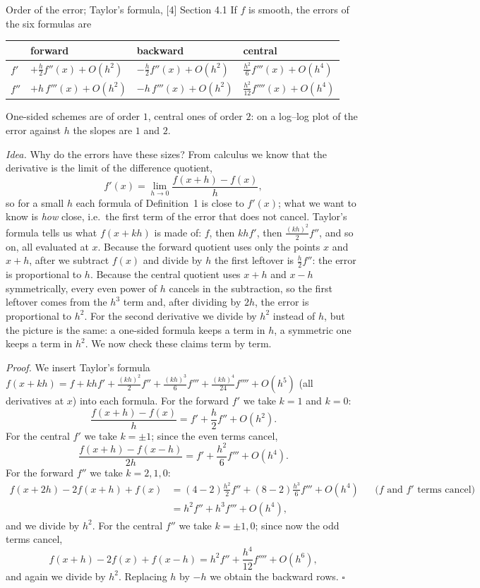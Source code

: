 \documentclass[11pt,a4paper]{article}
\begin{document}
\begin{lembox}{Order of the error; Taylor's formula, [4] Section 4.1}
If $f$ is smooth, the errors of the six formulas are
\begin{center}
\renewcommand{\arraystretch}{1.5}
\begin{tabular}{@{}llll@{}}
\toprule
 & forward & backward & central\\
\midrule
$f'$ & $+\frac h2f''(x)+O(h^2)$ & $-\frac h2f''(x)+O(h^2)$ & $\frac{h^2}{6}f'''(x)+O(h^4)$\\
$f''$ & $+h\,f'''(x)+O(h^2)$ & $-h\,f'''(x)+O(h^2)$ & $\frac{h^2}{12}f''''(x)+O(h^4)$\\
\bottomrule
\end{tabular}
\end{center}
One-sided schemes are of order $1$, central ones of order $2$: on a log--log plot of the error against $h$ the slopes are $1$ and $2$.
\end{lembox}
\noindent\emph{Idea.} Why do the errors have these sizes? From calculus we know that the derivative is the limit of the difference quotient,
\[
f'(x)=\lim_{h\to0}\frac{f(x+h)-f(x)}{h},
\]
so for a small $h$ each formula of Definition~1 is close to $f'(x)$; what we want to know is \emph{how} close, i.e.\ the first term of the error that does not cancel. Taylor's formula tells us what $f(x+kh)$ is made of: $f$, then $khf'$, then $\frac{(kh)^2}{2}f''$, and so on, all evaluated at $x$. Because the forward quotient uses only the points $x$ and $x+h$, after we subtract $f(x)$ and divide by $h$ the first leftover is $\frac h2f''$: the error is proportional to $h$. Because the central quotient uses $x+h$ and $x-h$ symmetrically, every even power of $h$ cancels in the subtraction, so the first leftover comes from the $h^3$ term and, after dividing by $2h$, the error is proportional to $h^2$. For the second derivative we divide by $h^2$ instead of $h$, but the picture is the same: a one-sided formula keeps a term in $h$, a symmetric one keeps a term in $h^2$. We now check these claims term by term.

\noindent\emph{Proof.} We insert Taylor's formula $f(x+kh)=f+khf'+\frac{(kh)^2}{2}f''+\frac{(kh)^3}{6}f'''+\frac{(kh)^4}{24}f''''+O(h^5)$ (all derivatives at $x$) into each formula. For the forward $f'$ we take $k=1$ and $k=0$:
\[
\frac{f(x+h)-f(x)}{h}=f'+\frac h2f''+O(h^2).
\]
For the central $f'$ we take $k=\pm1$; since the even terms cancel,
\[
\frac{f(x+h)-f(x-h)}{2h}=f'+\frac{h^2}{6}f'''+O(h^4).
\]
For the forward $f''$ we take $k=2,1,0$:
\begin{align*}
f(x+2h)-2f(x+h)+f(x)&=(4-2)\frac{h^2}{2}f''+(8-2)\frac{h^3}{6}f'''+O(h^4) && \text{($f$ and $f'$ terms cancel)}\\
&=h^2f''+h^3f'''+O(h^4),
\end{align*}
and we divide by $h^2$. For the central $f''$ we take $k=\pm1,0$; since now the odd terms cancel,
\[
f(x+h)-2f(x)+f(x-h)=h^2f''+\frac{h^4}{12}f''''+O(h^6),
\]
and again we divide by $h^2$. Replacing $h$ by $-h$ we obtain the backward rows. \hfill$\square$
\end{document}
